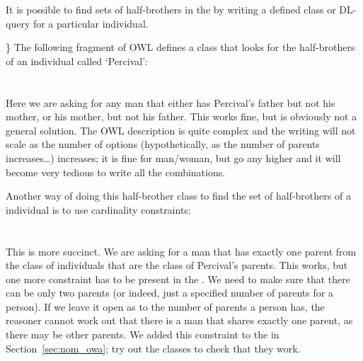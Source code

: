 It is possible to find sets of half-brothers in the \fhkb by writing a defined class or DL-query for a particular individual.{\herebedragons\} The following fragment of OWL defines a class that looks for the half-brothers of an individual called `Percival':
\\
\\
\\
Here we are asking for any man that either has Percival's father but not his mother, or his mother, but not his father. This works fine, but is obviously not a  general solution. The OWL description is quite complex and the writing will not scale as the number of options (hypothetically, as the number of parents increases\ldots) increases; it is fine for man/woman, but go any higher and it will become very tedious to write all the combinations.

Another way of doing this half-brother class to find the set of half-brothers of a individual is to use cardinality constraints:
\\
\\
\\

This is more succinct. We are asking for a man that has exactly one parent from the class of individuals that are the class of Percival's parents. This works, but one more constraint has to be present in the \fhkb. We need to make sure that there can be only two parents (or indeed, just a specified number of parents for a person). If we leave it open as to the number of parents a person has, the reasoner cannot work out that there is a man that shares exactly one parent, as there may be other parents. We added this constraint to the \fhkb in Section~\ref{sec:nom_owa}; try out the classes to check that they work.

}
